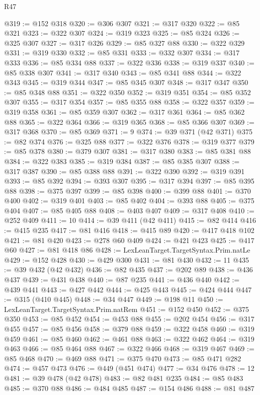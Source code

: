 \begin{lexlean}{R47}
\begin{coremodule}
@319 := @152 @318
@320 := @306 @307
@321 := @317 @320
@322 := @85 @321
@323 := @322 @307
@324 := @319 @323
@325 := @85 @324
@326 := @325 @307
@327 := @317 @326
@329 := @85 @327 @88
@330 := @322 @329
@331 := @319 @330
@332 := @85 @331
@333 := @332 @307
@334 := @317 @333
@336 := @85 @334 @88
@337 := @322 @336
@338 := @319 @337
@340 := @85 @338 @307
@341 := @317 @340
@343 := @85 @341 @88
@344 := @322 @343
@345 := @319 @344
@347 := @85 @345 @307
@348 := @317 @347
@350 := @85 @348 @88
@351 := @322 @350
@352 := @319 @351
@354 := @85 @352 @307
@355 := @317 @354
@357 := @85 @355 @88
@358 := @322 @357
@359 := @319 @358
@361 := @85 @359 @307
@362 := @317 @361
@364 := @85 @362 @88
@365 := @322 @364
@366 := @319 @365
@368 := @85 @366 @307
@369 := @317 @368
@370 := @85 @369
@371 := 9
@374 := @39 @371 (@42 @371)
@375 := @82 @374
@376 := @325 @88
@377 := @322 @376
@378 := @319 @377
@379 := @85 @378
@380 := @379 @307
@381 := @317 @380
@383 := @85 @381 @88
@384 := @322 @383
@385 := @319 @384
@387 := @85 @385 @307
@388 := @317 @387
@390 := @85 @388 @88
@391 := @322 @390
@392 := @319 @391
@393 := @85 @392
@394 := @393 @307
@395 := @317 @394
@397 := @85 @395 @88
@398 := @375 @397
@399 := @85 @398
@400 := @399 @88
@401 := @370 @400
@402 := @319 @401
@403 := @85 @402
@404 := @393 @88
@405 := @375 @404
@407 := @85 @405 @88
@408 := @403 @407
@409 := @317 @408
@410 := @252 @409
@411 := 10
@414 := @39 @411 (@42 @411)
@415 := @82 @414
@416 := @415 @235
@417 := @81 @416
@418 := @415 @89
@420 := @417 @418 @102
@421 := @81 @420
@423 := @278 @60 @409
@424 := @421 @423
@425 := @417 @60
@427 := @81 @418 @86
@428 := LexLeanTarget.TargetSyntax.Prim.natLe
@429 := @152 @428
@430 := @429 @300
@431 := @81 @430
@432 := 11
@435 := @39 @432 (@42 @432)
@436 := @82 @435
@437 := @202 @89
@438 := @436 @437
@439 := @431 @438
@440 := @87 @235
@441 := @436 @440
@442 := @439 @441
@443 := @427 @442
@444 := @425 @443
@445 := @424 @444
@447 := @315 (@410 @445)
@448 := @34 @447
@449 := @198 @11
@450 := LexLeanTarget.TargetSyntax.Prim.natRem
@451 := @152 @450
@452 := @375 @350
@453 := @85 @452
@454 := @453 @88
@455 := @202 @454
@456 := @317 @455
@457 := @85 @456
@458 := @379 @88
@459 := @322 @458
@460 := @319 @459
@461 := @85 @460
@462 := @461 @88
@463 := @322 @462
@464 := @319 @463
@466 := @85 @464 @88
@467 := @322 @466
@468 := @319 @467
@469 := @85 @468
@470 := @469 @88
@471 := @375 @470
@473 := @85 @471 @282
@474 := @457 @473
@476 := @449 (@451 @474)
@477 := @34 @476
@478 := 12
@481 := @39 @478 (@42 @478)
@483 := @82 @481 @235
@484 := @85 @483
@485 := @370 @88
@486 := @484 @485
@487 := @154 @486
@488 := @81 @487

\end{coremodule}
\end{lexlean}
